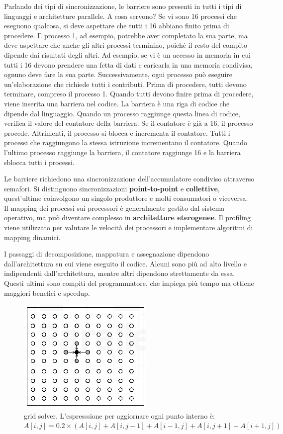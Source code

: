 Parlando dei tipi di sincronizzazione, le barriere sono presenti in tutti i tipi di linguaggi e architetture parallele. A cosa servono? Se vi sono 16 processi che eseguono qualcosa, si deve aspettare che tutti i 16 abbiano finito prima di procedere. Il processo 1, ad esempio, potrebbe aver completato la sua parte, ma deve aspettare che anche gli altri processi terminino, poiché il resto del compito dipende dai risultati degli altri. Ad esempio, se vi è un accesso in memoria in cui tutti i 16 devono prendere una fetta di dati e caricarla in una memoria condivisa, ognuno deve fare la sua parte. Successivamente, ogni processo può eseguire un'elaborazione che richiede tutti i contributi. Prima di procedere, tutti devono terminare, compreso il processo 1. Quando tutti devono finire prima di procedere, viene inserita una barriera nel codice. La barriera è una riga di codice che dipende dal linguaggio. Quando un processo raggiunge questa linea di codice, verifica il valore del contatore della barriera. Se il contatore è già a 16, il processo procede. Altrimenti, il processo si blocca e incrementa il contatore. Tutti i processi che raggiungono la stessa istruzione incrementano il contatore. Quando l'ultimo processo raggiunge la barriera, il contatore raggiunge 16 e la barriera sblocca tutti i processi.

Le barriere richiedono una sincronizzazione dell'accumulatore condiviso attraverso semafori. Si distinguono sincronizzazioni \textbf{point-to-point} e \textbf{collettive}, quest'ultime coinvolgono un singolo produttore e molti consumatori o viceversa. Il mapping dei processi sui processori è generalmente gestito dal sistema operativo, ma può diventare complesso in \textbf{architetture eterogenee}. Il profiling viene utilizzato per valutare le velocità dei processori e implementare algoritmi di mapping dinamici.

I passaggi di decomposizione, mappatura e assegnazione dipendono dall'architettura su cui viene eseguito il codice. Alcuni sono più ad alto livello e indipendenti dall'architettura, mentre altri dipendono strettamente da essa. Questi ultimi sono compiti del programmatore, che impiega più tempo ma ottiene maggiori benefici e speedup.
\begin{figure}[th]
	\centering
	\includegraphics[width=0.45\linewidth]{img/grid}
	\caption{grid solver. L'espresssione per aggiornare ogni punto interno è: $A[i,j]=0.2 \times(A[i,j]+A[i,j-1]+A[i-1,j]+A[i,j+1]+A[i+1,j])$}
	\label{fig:grid}
\end{figure}

